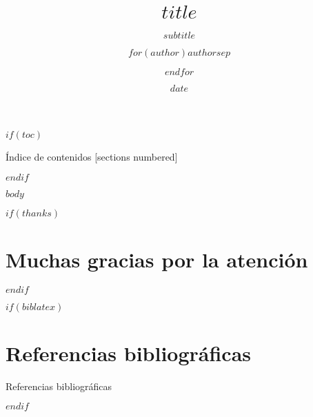 \documentclass[$if(fontsize)$$fontsize$,$endif$$if(handout)$handout,$endif$$for(classoption)$$classoption$$sep$,$endfor$]{beamer}
\title{$title$}
\subtitle{$subtitle$}
\author{$for(author)$$author$$sep$ \and $endfor$}
\institute{$for(institute)$$institute$$sep$ \and $endfor$}
\date{$date$}
\newcounter{cont}
\begin{document}
\maketitle


$if(toc)$
\begin{frame}{Índice de contenidos}
  [sections numbered]
  \tableofcontents[hideallsubsections]
\end{frame}
$endif$


$body$

$if(thanks)$
\section{Muchas gracias por la atención}\label{atencion}
$endif$

$if(biblatex)$
\section*{Referencias bibliográficas}\label{refs-bib}
\begin{frame}[allowframebreaks]{Referencias bibliográficas}
\printbibliography[heading=none]
\end{frame}
$endif$
\end{document}
